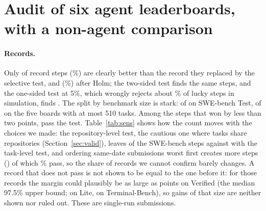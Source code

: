 \documentclass[11pt]{article}
\begin{document}
\section{Audit of six agent leaderboards, with a non-agent comparison}\label{sec:audit}
\begin{table}[t]
\centering\footnotesize
\resizebox{\textwidth}{!}{}
\caption{Audit summary. Top-rank freq.: share of redraws of the tasks in which the leader has the top score. 95\% set: number of systems that could be the true best. Records sig.: record steps clearly better than the previous record at the 5\% level (selective exact paired test, tasks as the unit) over all record steps. Holm: still clearly better after the Holm correction within the board. Repository-level: the same count with repositories as the unit, the cautious one. MDD: smallest true gap the board catches with 80\% power. Last column: the leader's reported score and its winner's-curse adjustment (iterated bootstrap); where two systems tie for first, the leader is the one that ranks first more often.}
\label{tab:audit}
\end{table}

\paragraph{Records.}
Only \NumTotalSig{} of \NumTotalSteps{} record steps (\NumTotalSigPct\%) are clearly better than the record they replaced by the selective test, and \NumTotalHolm{} (\NumTotalHolmPct\%) after Holm; the two-sided test finds the same \NumTotalTwoSided{} steps, and the one-sided test at 5\%, which wrongly rejects about \NumNullSelOneB\% of lucky steps in simulation, finds \NumTotalOneSided{}.
The split by benchmark size is stark: \NumLargeSig{} of \NumLargeSteps{} on SWE-bench Test, \NumSmallSig{} of \NumSmallSteps{} on the five boards with at most 510 tasks.
Among the \NumSmallMarginSteps{} steps that won by less than two points, \NumSmallMarginSig{} pass the test.
Table~\ref{tab:sens} shows how the count moves with the choices we made: the repository-level test, the cautious one where tasks share repositories (Section~\ref{sec:valid}), leaves \NumClusterSig{} of the \NumClusterSteps{} SWE-bench steps against \NumSWEIidSig{} with the task-level test, and ordering same-date submissions worst first creates more steps (\NumWorstSteps{}) of which \NumWorstSigPct\% pass, so the share of records we cannot confirm barely changes.
A record that does not pass is not shown to be equal to the one before it: for those records the margin could plausibly be as large as \NumVerifiedUpperNonSig{} points on Verified (the median 97.5\% upper bound; \NumLiteUpperNonSig{} on Lite, \NumTBUpperNonSig{} on Terminal-Bench), so gains of that size are neither shown nor ruled out.
These are single-run submissions.
\end{document}
